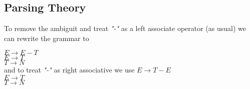 \subsection{Parsing Theory}

To remove the ambiguit and treat \emph{"-"} as  a left associate operator (as usual) we can rewrite the grammar to

$E \rightarrow E - T$ \\
$E \rightarrow T$ \\
$T \rightarrow N$ \\
and to treat \emph{"-"} as right associative we use
$E \rightarrow T - E$ \\
$E \rightarrow T$ \\
$T \rightarrow N$ \\